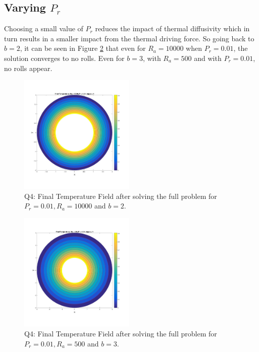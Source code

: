 \documentclass{article}
\begin{document}
\subsection{Varying $P_r$}

Choosing a small value of $P_r$ reduces the impact of thermal diffusivity which in turn results in a smaller impact from the thermal driving force. So going back to $b=2$, it can be seen in Figure \ref{fig:q4pr001} that even for $R_a = 10000$ when $P_r = 0.01$, the solution converges to no rolls.  Even for $b=3$, with $R_a = 500$ and with $P_r = 0.01$, no rolls appear. 

	\begin{figure}[h!]
		\centering
		\includegraphics[width = 0.49\textwidth]{fig_q4pr001}
		\caption{Q4: Final Temperature Field after solving the full problem for $P_r = 0.01, R_a = 10000$ and $b=2$.}
		\label{fig:q4pr001}
	\end{figure}
	
	\begin{figure}[h!]
		\centering
		\includegraphics[width = 0.49\textwidth]{fig_q4pr001b3}
		\caption{Q4: Final Temperature Field after solving the full problem for $P_r = 0.01, R_a = 500$ and $b=3$.}
		\label{fig:q4pr001}
	\end{figure}
	
\end{document}
